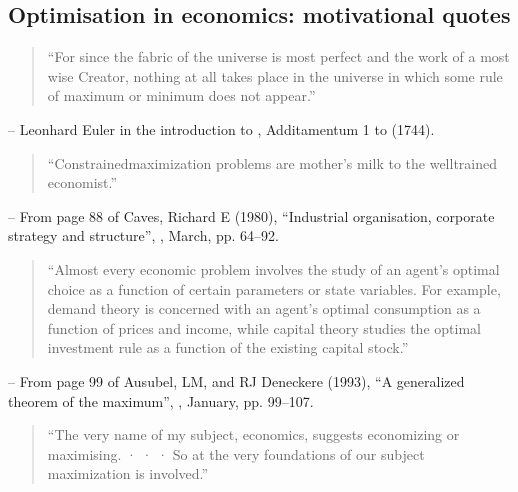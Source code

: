 \documentclass[letterpaper,10pt,english]{jupyterBook}
\begin{document}
\subsection{Optimisation in economics: motivational quotes}
\label{\detokenize{01.intro_to_economics:optimisation-in-economics-motivational-quotes}}\begin{quote}

\sphinxAtStartPar
“For since the fabric of the universe is most perfect and the work of a most wise Creator, nothing at all takes place in the universe in which some rule of maximum or minimum does not appear.”
\end{quote}

\sphinxAtStartPar
– Leonhard Euler in the introduction to , Additamentum 1 to  (1744).


\begin{quote}

\sphinxAtStartPar
“Constrained\sphinxhyphen{}maximization problems are mother’s milk to the well\sphinxhyphen{}trained economist.”
\end{quote}

\sphinxAtStartPar
– From page 88 of Caves, Richard E (1980), “Industrial organisation, corporate strategy and structure”, , March, pp. 64–92.


\begin{quote}

\sphinxAtStartPar
“Almost every economic problem involves the study of an agent’s optimal choice as a function of certain parameters or state variables. For example, demand theory is concerned with an agent’s optimal consumption as a function of prices and income, while capital theory studies the optimal investment rule as a function of the existing capital stock.”
\end{quote}

\sphinxAtStartPar
– From page 99 of Ausubel, LM, and RJ Deneckere (1993), “A generalized theorem of the maximum”, , January, pp. 99–107.


\begin{quote}

\sphinxAtStartPar
“The very name of my subject, economics, suggests economizing or maximising. · · · So at the very foundations of our subject maximization is involved.”
\end{quote}
\end{document}
